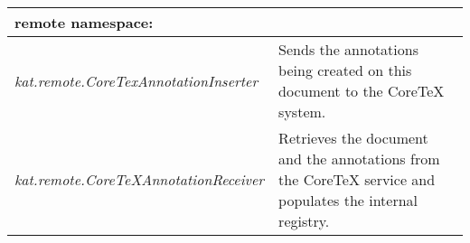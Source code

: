 \begin{longtable}{p{6cm}|p{8cm}}
 \textbf{remote} namespace: \\\hline
 \textit{kat.remote.CoreTexAnnotationInserter} & Sends the annotations being created on this document to the CoreTeX system.\\\hline
 \textit{kat.remote.CoreTeXAnnotationReceiver} & Retrieves the document and the annotations from the CoreTeX service and populates the internal registry. \\\hline
\end{longtable}


